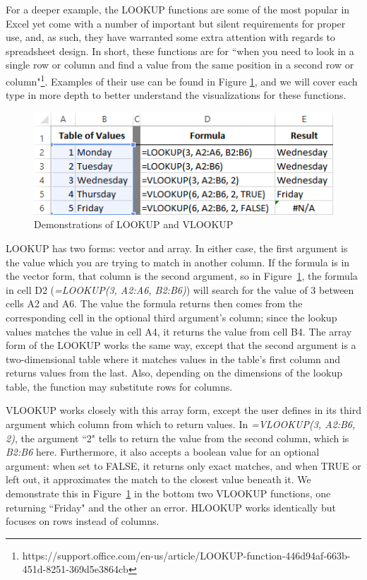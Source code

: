 \documentclass[conference]{IEEEtran}
\begin{document}
	For a deeper example, the LOOKUP functions are some of the most popular in
	Excel yet come with a number of important but silent requirements for proper
	use, and, as such, they have warranted some extra attention with regards to
	spreadsheet design. In short, these functions are for ``when you need to look
	in a single row or column and find a value from the same position in a second
	row or
	column"\footnote{https://support.office.com/en-us/article/LOOKUP-function-446d94af-663b-451d-8251-369d5e3864cb}. Examples of their use can be found in Figure \ref{fig:lookupexample}, and we will cover each type in more depth to better understand the visualizations for these functions.
	
	\begin{figure}[h] \centering
		\includegraphics[width=.5\textwidth]{lookupexample} \caption{Demonstrations of
			LOOKUP and VLOOKUP} \label{fig:lookupexample} \end{figure}
	
	LOOKUP has two forms: vector and array. In either case, the first argument is
	the value which you are trying to match in another column. If the formula is in
	the vector form, that column is the second argument, so in
	Figure~\ref{fig:lookupexample}, the formula in cell D2 (\textit{=LOOKUP(3,
		A2:A6, B2:B6)}) will search for the value of 3 between cells A2 and A6. The
	value the formula returns then comes from the corresponding cell in the
	optional third argument's column; since the lookup values matches the value in
	cell A4, it returns the value from cell B4. The array form of the LOOKUP works
	the same way, except that the second argument is a two-dimensional table where
	it matches values in the table's first column and returns values from the last.
	Also, depending on the dimensions of the lookup table, the function may
	substitute rows for columns.
	
	VLOOKUP works closely with this array form, except the user defines in its
	third argument which column from which to return values. In \textit{=VLOOKUP(3,
		A2:B6, 2)}, the argument ``2" tells to return the value from the second column,
	which is \textit{B2:B6} here. Furthermore, it also accepts a boolean value for
	an optional argument: when set to FALSE, it returns only exact matches, and
	when TRUE or left out, it approximates the match to the closest value beneath
	it. We demonstrate this in Figure~\ref{fig:lookupexample} in the bottom two
	VLOOKUP functions, one returning ``Friday" and the other an error. HLOOKUP
	works identically but focuses on rows instead of columns.
	
\end{document}

